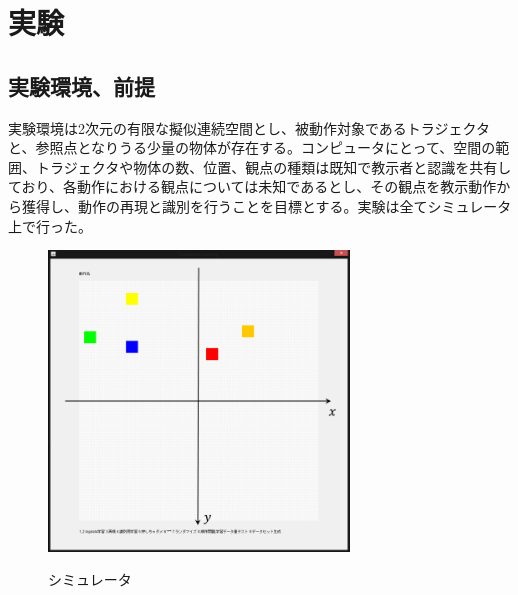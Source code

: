 ﻿%
\chapter{実験}

\section{実験環境、前提}

実験環境は2次元の有限な擬似連続空間とし、被動作対象であるトラジェクタと、参照点となりうる少量の物体が存在する。コンピュータにとって、空間の範囲、トラジェクタや物体の数、位置、観点の種類は既知で教示者と認識を共有しており、各動作における観点については未知であるとし、その観点を教示動作から獲得し、動作の再現と識別を行うことを目標とする。実験は全てシミュレータ上で行った。
	\begin{figure}[h]
		\begin{center}
			\includegraphics[width=8cm]{figure3.png} \\ %
			\caption{シミュレータ}
		\end{center}
	\end{figure}

